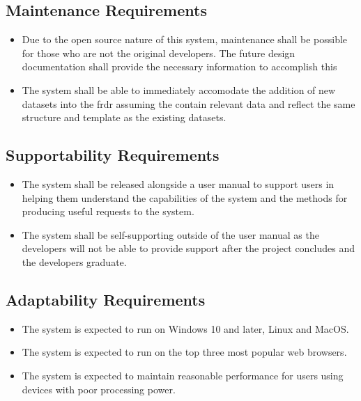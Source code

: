 \documentclass[12pt]{article}
\begin{document}
\subsection{Maintenance Requirements}

\begin{itemize}
    \item Due to the open source nature of this system, maintenance shall be possible for those who are not the original developers.
    The future design documentation shall provide the necessary information to accomplish this
    \item The system shall be able to immediately accomodate the addition of new datasets into the \gls{frdr}
    assuming the contain relevant data and reflect the same structure and template as the existing datasets.
\end{itemize}

\subsection{Supportability Requirements}

\begin{itemize}
    \item The system shall be released alongside a user manual to support users in helping them understand
    the capabilities of the system and the methods for producing useful requests to the system.
    \item The system shall be self-supporting outside of the user manual as the developers will not be able
    to provide support after the project concludes and the developers graduate.
\end{itemize}

\subsection{Adaptability Requirements}

\begin{itemize}
    \item The system is expected to run on Windows 10 and later, Linux and MacOS.
    \item The system is expected to run on the top three most popular web browsers.
    \item The system is expected to maintain reasonable performance for users using devices
    with poor processing power. 

\end{itemize}
\end{document}
